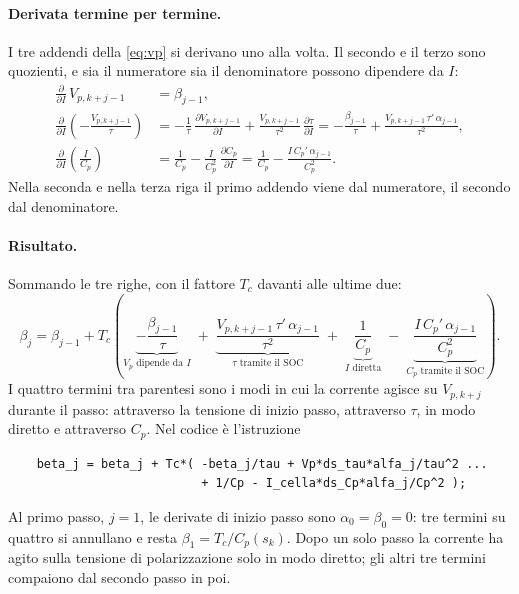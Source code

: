\documentclass[11pt,a4paper]{article}
\newcommand{\Tc}{T_c}
\begin{document}
\paragraph{Derivata termine per termine.} I tre addendi della \eqref{eq:vp} si
derivano uno alla volta. Il secondo e il terzo sono quozienti, e sia il
numeratore sia il denominatore possono dipendere da $I$:
\begin{align*}
  \frac{\partial}{\partial I}\, V_{p,k+j-1} &= \beta_{j-1} , \\[4pt]
  \frac{\partial}{\partial I} \left(-\frac{V_{p,k+j-1}}{\tau}\right)
     &= -\frac{1}{\tau}\,\frac{\partial V_{p,k+j-1}}{\partial I}
        + \frac{V_{p,k+j-1}}{\tau^2}\,\frac{\partial \tau}{\partial I}
      = -\frac{\beta_{j-1}}{\tau}
        + \frac{V_{p,k+j-1}\,\tau'\,\alpha_{j-1}}{\tau^2} , \\[4pt]
  \frac{\partial}{\partial I} \left(\frac{I}{C_p}\right)
     &= \frac{1}{C_p} - \frac{I}{C_p^2}\,\frac{\partial C_p}{\partial I}
      = \frac{1}{C_p} - \frac{I\,C_p'\,\alpha_{j-1}}{C_p^2} .
\end{align*}
Nella seconda e nella terza riga il primo addendo viene dal numeratore, il
secondo dal denominatore.

\paragraph{Risultato.} Sommando le tre righe, con il fattore $\Tc$ davanti
alle ultime due:
\begin{equation}
  \beta_j = \beta_{j-1} + \Tc\left(
      \underbrace{-\frac{\beta_{j-1}}{\tau}}_{V_p \text{ dipende da } I}
      \;+\; \underbrace{\frac{V_{p,k+j-1}\,\tau'\,\alpha_{j-1}}{\tau^2}}_{\tau \text{ tramite il SOC}}
      \;+\; \underbrace{\frac{1}{C_p}}_{I \text{ diretta}}
      \;-\; \underbrace{\frac{I\,C_p'\,\alpha_{j-1}}{C_p^2}}_{C_p \text{ tramite il SOC}}
  \right) .
  \label{eq:beta}
\end{equation}
I quattro termini tra parentesi sono i modi in cui la corrente agisce su
$V_{p,k+j}$ durante il passo: attraverso la tensione di inizio passo,
attraverso $\tau$, in modo diretto e attraverso $C_p$. Nel codice è
l'istruzione
{\small
\begin{verbatim}
    beta_j = beta_j + Tc*( -beta_j/tau + Vp*ds_tau*alfa_j/tau^2 ...
                           + 1/Cp - I_cella*ds_Cp*alfa_j/Cp^2 );
\end{verbatim}
}
\noindent
Al primo passo, $j = 1$, le derivate di inizio passo sono $\alpha_0 = \beta_0
= 0$: tre termini su quattro si annullano e resta
$\beta_1 = \Tc / C_p(s_k)$. Dopo un solo passo la corrente ha agito sulla
tensione di polarizzazione solo in modo diretto; gli altri tre termini
compaiono dal secondo passo in poi.
\end{document}
